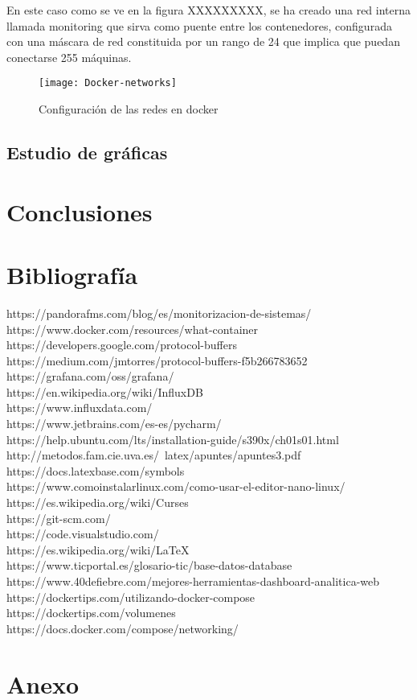 \documentclass[ spanish, a4paper, 12pt, oneside]{report}
\begin{document}
En este caso como se ve en la figura XXXXXXXXX, se ha creado una red interna llamada monitoring que sirva como puente entre los contenedores, configurada con una máscara de red constituida por un rango de 24 que implica que puedan conectarse 255 máquinas.\\

\begin{figure}[!h]
   \centering
   \texttt{[image: Docker-networks]}\\
      \caption{\label{fig: Configuración de las redes en docker} Configuración de las redes en docker}
\end{figure}

\section{Estudio de gráficas}

\chapter{Conclusiones}

\chapter{Bibliografía}
https://pandorafms.com/blog/es/monitorizacion-de-sistemas/ \\
https://www.docker.com/resources/what-container \\
https://developers.google.com/protocol-buffers \\
https://medium.com/jmtorres/protocol-buffers-f5b266783652 \\
https://grafana.com/oss/grafana/ \\
https://en.wikipedia.org/wiki/InfluxDB \\
https://www.influxdata.com/ \\
https://www.jetbrains.com/es-es/pycharm/ \\
https://help.ubuntu.com/lts/installation-guide/s390x/ch01s01.html \\
http://metodos.fam.cie.uva.es/~latex/apuntes/apuntes3.pdf \\
https://docs.latexbase.com/symbols \\
https://www.comoinstalarlinux.com/como-usar-el-editor-nano-linux/\\
https://es.wikipedia.org/wiki/Curses \\
https://git-scm.com/ \\
https://code.visualstudio.com/ \\
https://es.wikipedia.org/wiki/LaTeX \\
https://www.ticportal.es/glosario-tic/base-datos-database \\
https://www.40defiebre.com/mejores-herramientas-dashboard-analitica-web \\
https://dockertips.com/utilizando-docker-compose \\
https://dockertips.com/volumenes \\
https://docs.docker.com/compose/networking/ \\

\chapter{Anexo}
\listoffigures
\end{document}
